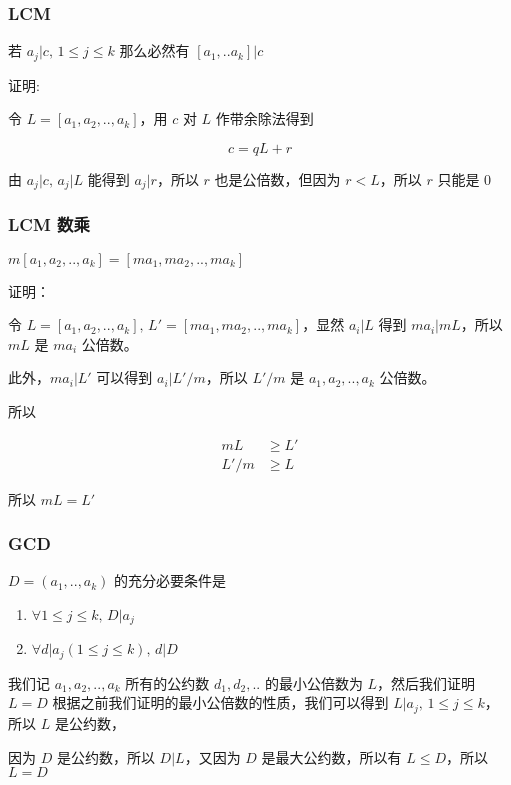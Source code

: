\documentclass[12pt,a4paper]{ctexart}
\begin{document}
\subsubsection{LCM}

若 $a_j \vert c,\, 1 \le j \le k$ 那么必然有 $[a_1,..a_k] \vert c$

证明:

令 $L = [a_1,a_2, .. ,a_k]$，用 $c$ 对 $L$ 作带余除法得到

\[
c = qL + r
\]

由 $a_j \vert c,\, a_j \vert L$ 能得到 $a_j \vert r$，所以 $r$ 也是公倍数，但因为 $r < L$，所以 $r$ 只能是 $0$

\subsubsection{LCM 数乘}

$m[a_1,a_2,..,a_k] = [ma_1,ma_2,..,ma_k]$

证明：

令 $L= [a_1,a_2,..,a_k],\, L' =[ma_1, ma_2,..,ma_k]$，显然 $a_i \vert L$ 得到 $ma_i \vert mL$，所以 $mL$ 是 $ma_i$ 公倍数。

此外，$ma_i \vert L'$ 可以得到 $a_i \vert L'/m$，所以 $L'/m$ 是 $a_1,a_2,..,a_k$ 公倍数。

所以

\begin{align*}
    mL &\ge L' \\
    L'/m &\ge L
\end{align*}

所以 $mL = L'$

\subsubsection{GCD}

$D=(a_1,..,a_k)$ 的充分必要条件是

\begin{enumerate}
    \item $\forall 1 \le j \le k,\, D \vert a_j$
    \item $\forall d \vert a_j(1 \le j \le k),\, d \vert D$
\end{enumerate}

我们记 $a_1,a_2,..,a_k$ 所有的公约数 $d_1,d_2,..$ 的最小公倍数为 $L$，然后我们证明 $L = D$
根据之前我们证明的最小公倍数的性质，我们可以得到 $L \vert a_j,\, 1 \le j \le k$，所以 $L$ 是公约数，

因为 $D$ 是公约数，所以 $D \vert L$，又因为 $D$ 是最大公约数，所以有 $L \le D$，所以 $L = D$
\end{document}
